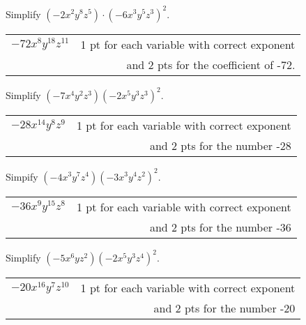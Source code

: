 {
	Simplify $(-2x^2 y^8 z^5)\cdot(-6 x^3 y^5z^3)^2$.
}
{
	\begin{tabular}{l r}
	$-72x^8 y^{18} z^{11}$ & 1 pt for each variable with correct exponent\\
	& and 2 pts for the coefficient of -72.
	\end{tabular}
}

{
	Simplify $(-7x^4 y^2 z^3)(-2x^5 y^3 z^3)^2$.
}
{
	\begin{tabular}{l r}
	$-28x^{14} y^8 z^9$ & 1 pt for each variable with correct exponent \\ & and 2 pts for the number -28
	\end{tabular}
}

{
	Simpify $(-4x^3y^7z^4)(-3x^3y^4z^2)^2$.
}
{
	\begin{tabular}{l r}
	$-36x^{9} y^{15} z^8$ & 1 pt for each variable with correct exponent \\ & and 2 pts for the number -36
	\end{tabular}
}

{
	Simplify $(-5x^6yz^2)(-2x^5y^3z^4)^2$.
}
{
	\begin{tabular}{l r}
	$-20x^{16} y^{7} z^{10}$ & 1 pt for each variable with correct exponent \\ & and 2 pts for the number -20
	\end{tabular}
}
